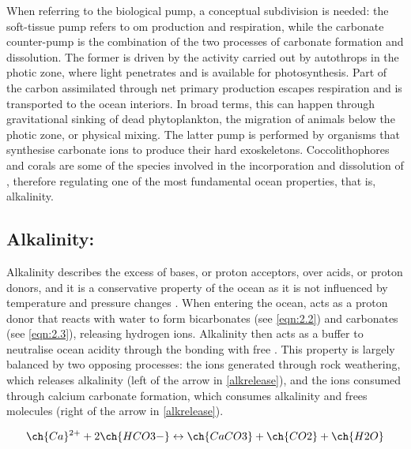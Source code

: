 When referring to the biological pump, a conceptual subdivision is needed: the soft-tissue pump refers to \ac{om} production and respiration, while the carbonate counter-pump is the combination of the two processes of carbonate formation and dissolution. The former is driven by the activity carried out by autothrops in the photic zone, where light penetrates and is available for photosynthesis. Part of the carbon assimilated through net primary production escapes respiration and is transported to the ocean interiors. In broad terms, this can happen through gravitational sinking of dead phytoplankton, the migration of animals below the photic zone, or physical mixing. The latter pump is performed by organisms that synthesise carbonate ions to produce their hard exoskeletons. Coccolithophores and corals are some of the species involved in the incorporation and dissolution of  \citep{devries2022ocean}, therefore regulating one of the most fundamental ocean properties, that is, alkalinity.  

\subsection{Alkalinity:}

Alkalinity describes the excess of bases, or proton acceptors, over acids, or proton donors, and it is a conservative property of the ocean as it is not influenced by temperature and pressure changes \citep{wolf2007total}. When entering the ocean,  acts as a proton donor that reacts with water to form bicarbonates (see \ref{eqn:2.2}) and carbonates (see \ref{eqn:2.3}), releasing hydrogen ions. Alkalinity then acts as a buffer to neutralise ocean acidity through the bonding with free  \citep{middelburg2020ocean}. This property is largely balanced by two opposing processes: the ions generated through rock weathering, which releases alkalinity (left of the arrow in \ref{alkrelease}), and the ions consumed through calcium carbonate formation, which consumes alkalinity and frees  molecules (right of the arrow in \ref{alkrelease}). 

\begin{center}

\begin{equation} 
\label{alkrelease}
\ch{Ca}\textsuperscript{2+} +  2\ch{HCO3-} \leftrightarrow \ch{CaCO3} + \ch{CO2} + \ch{H2O}
\end{equation}

\end{center}

